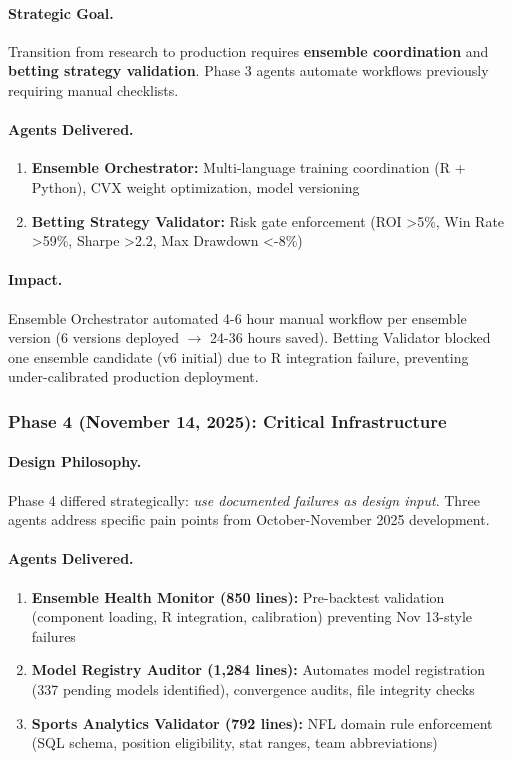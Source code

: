 \paragraph{Strategic Goal.}
Transition from research to production requires \textbf{ensemble coordination} and \textbf{betting strategy validation}. Phase 3 agents automate workflows previously requiring manual checklists.

\paragraph{Agents Delivered.}
\begin{enumerate}[itemsep=2pt,parsep=0pt]
    \item \textbf{Ensemble Orchestrator:} Multi-language training coordination (R + Python), CVX weight optimization, model versioning
    \item \textbf{Betting Strategy Validator:} Risk gate enforcement (ROI >5\%, Win Rate >59\%, Sharpe >2.2, Max Drawdown <-8\%)
\end{enumerate}

\paragraph{Impact.}
Ensemble Orchestrator automated 4-6 hour manual workflow per ensemble version (6 versions deployed $\to$ 24-36 hours saved). Betting Validator blocked one ensemble candidate (v6 initial) due to R integration failure, preventing under-calibrated production deployment.

\subsubsection{Phase 4 (November 14, 2025): Critical Infrastructure}

\paragraph{Design Philosophy.}
Phase 4 differed strategically: \textit{use documented failures as design input}. Three agents address specific pain points from October-November 2025 development.

\paragraph{Agents Delivered.}
\begin{enumerate}[itemsep=2pt,parsep=0pt]
    \item \textbf{Ensemble Health Monitor (850 lines):} Pre-backtest validation (component loading, R integration, calibration) preventing Nov 13-style failures
    \item \textbf{Model Registry Auditor (1,284 lines):} Automates model registration (337 pending models identified), convergence audits, file integrity checks
    \item \textbf{Sports Analytics Validator (792 lines):} NFL domain rule enforcement (SQL schema, position eligibility, stat ranges, team abbreviations)
\end{enumerate}

